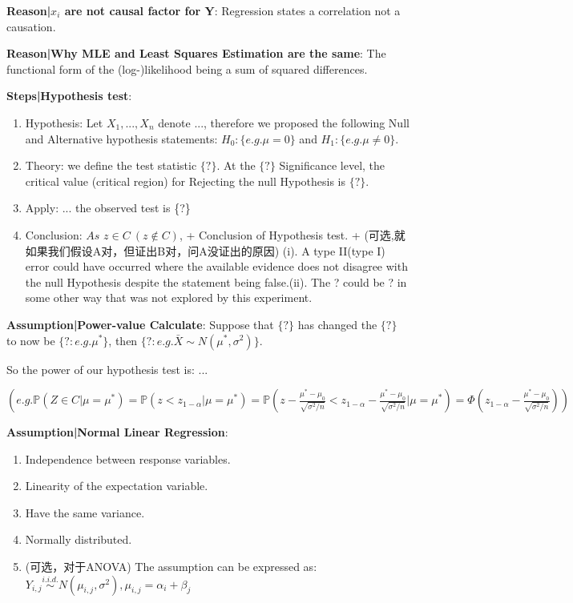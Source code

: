 \documentclass[9pt]{article}
\begin{document}
    \textbf{Reason|$x_i$ are not causal factor for Y}: Regression states a correlation not a causation.

    \textbf{Reason|Why MLE and Least Squares Estimation are the same}: The functional form of the (log-)likelihood being a sum of squared differences.

    \textbf{Steps|Hypothesis test}:
    \begin{enumerate}[itemsep=-3pt, topsep=-2pt]
        \item Hypothesis: Let $X_1,...,X_n$ denote ..., therefore we proposed the following Null and Alternative hypothesis statements: $H_0:\{e.g.\mu=0\}$ and $H_1:\{e.g.\mu\ne0\}$.
        \item Theory: we define the test statistic $\{?\}$. At the $\{?\}$ Significance level, the critical value (critical region) for Rejecting the null Hypothesis is $\{?\}$.
        \item Apply: ... the observed test is \{?\}
        \item Conclusion: $As$ $z\in C \ (z\notin C)$, + Conclusion of Hypothesis test. + (可选,就如果我们假设A对，但证出B对，问A没证出的原因) (i). A type II(type I) error could have occurred where the available evidence does not disagree with the null Hypothesis despite the statement being false.(ii). The ? could be ? in some other way that was not explored by this experiment.
    \end{enumerate}

    \textbf{Assumption|Power-value Calculate}: Suppose that $\{?\}$ has changed the $\{?\}$ to now be $\{?:e.g.\mu^*\}$, then $\{?:e.g.\bar{X}\sim N(\mu^*,\sigma^2)\}$.

    \hspace*{3.5cm}So the power of our hypothesis test is: ...

    \hspace*{3.5cm}$\left(e.g.\mathbb{P}(Z\in C|\mu=\mu^*)=\mathbb{P}(z<z_{1-\alpha}|\mu=\mu^*)=\mathbb{P}(z-\frac{\mu^*-\mu_0}{\sqrt{\sigma^2/n}}<z_{1-\alpha}-\frac{\mu^*-\mu_0}{\sqrt{\sigma^2/n}}|\mu=\mu^*)=\Phi(z_{1-\alpha}-\frac{\mu^*-\mu_0}{\sqrt{\sigma^2/n}})\right)$

    \textbf{Assumption|Normal Linear Regression}:
    \begin{enumerate}[itemsep=-3pt, topsep=-2pt]
        \item Independence between response variables.
        \item Linearity of the expectation variable.
        \item Have the same variance.
        \item Normally distributed.
        \item (可选，对于ANOVA) The assumption can be expressed as: $Y_{i,j}\stackrel{i.i.d.}{\sim}N(\mu_{i,j},\sigma^2),\mu_{i,j}=\alpha_i+\beta_j$
    \end{enumerate}
\end{document}
